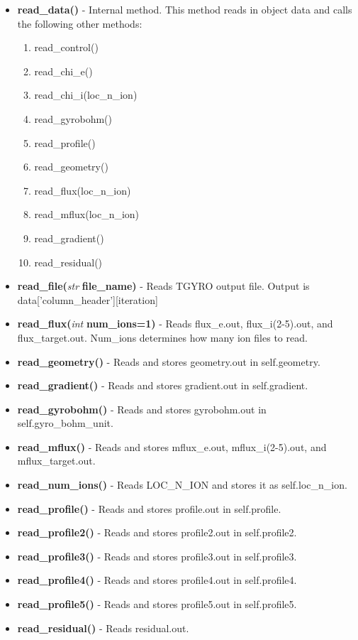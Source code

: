 \documentclass{article}
\begin{document}
\begin{itemize}
\item \textbf{read\_data()} - Internal method.  This method reads in object data and calls the following other methods:
\begin{enumerate}
\item read\_control()
\item read\_chi\_e()
\item read\_chi\_i(loc\_n\_ion)
\item read\_gyrobohm()
\item read\_profile()
\item read\_geometry()
\item read\_flux(loc\_n\_ion)
\item read\_mflux(loc\_n\_ion)
\item read\_gradient()
\item read\_residual()
\end{enumerate}
\item \textbf{read\_file(}\emph{str}\textbf{ file\_name)} - Reads TGYRO output file.  Output is data['column\_header'][iteration]
\item \textbf{read\_flux(}\emph{int}\textbf{ num\_ions=1)} - Reads flux\_e.out, flux\_i(2-5).out, and flux\_target.out.  Num\_ions determines how many ion files to read.
\item \textbf{read\_geometry()} - Reads and stores geometry.out in self.geometry.
\item \textbf{read\_gradient()} - Reads and stores gradient.out in self.gradient.
\item \textbf{read\_gyrobohm()} - Reads and stores gyrobohm.out in self.gyro\_bohm\_unit.
\item \textbf{read\_mflux()} - Reads and stores mflux\_e.out, mflux\_i(2-5).out, and mflux\_target.out.
\item \textbf{read\_num\_ions()} - Reads LOC\_N\_ION and stores it as self.loc\_n\_ion.
\item \textbf{read\_profile()} - Reads and stores profile.out in self.profile.
\item \textbf{read\_profile2()} - Reads and stores profile2.out in self.profile2.
\item \textbf{read\_profile3()} - Reads and stores profile3.out in self.profile3.
\item \textbf{read\_profile4()} - Reads and stores profile4.out in self.profile4.
\item \textbf{read\_profile5()} - Reads and stores profile5.out in self.profile5.
\item \textbf{read\_residual()} - Reads residual.out.

\end{itemize}
\end{document}

